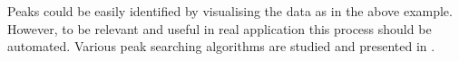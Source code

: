 Peaks could be easily identified by visualising the data as in the above example. However, to be relevant and useful in real application this process should be automated. Various peak searching algorithms are studied and presented in \cite{ventzas2011peak}.



\FloatBarrier


